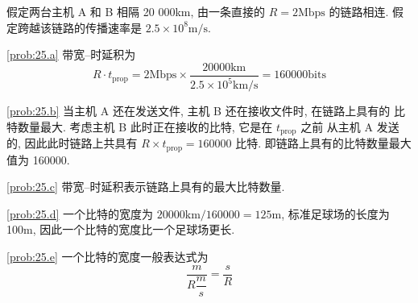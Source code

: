 \documentclass[boxes]{homework}
\begin{document}
\begin{problem}
假定两台主机 A 和 B 相隔 20 000km, 由一条直接的 $R = 2\text{Mbps}$ 的链路相连.
假定跨越该链路的传播速率是 $2.5 \times 10^{8}\text{m/s}$.
\end{problem}
\begin{solution}
    \ref{prob:25.a} 带宽--时延积为
    \begin{equation}
        R \cdot t_{\text{prop}} = 2\text{Mbps} \times
        \frac{ 20000\text{km} }{ 2.5 \times 10^{5} \text{km/s} } =
        160000\text{bits}
    \end{equation}

    \ref{prob:25.b} 当主机 A 还在发送文件, 主机 B 还在接收文件时, 在链路上具有的
    比特数量最大. 考虑主机 B 此时正在接收的比特, 它是在 $t_{\text{prop}}$ 之前
    从主机 A 发送的, 因此此时链路上共具有 $R \times t_{\text{prop}} = 160000$
    比特. 即链路上具有的比特数量最大值为 160000.

    \ref{prob:25.c} 带宽--时延积表示链路上具有的最大比特数量.

    \ref{prob:25.d} 一个比特的宽度为 $20000\text{km}/160000= 125$m,
    标准足球场的长度为 100m, 因此一个比特的宽度比一个足球场更长.

    \ref{prob:25.e} 一个比特的宽度一般表达式为
    \begin{equation}
        \frac{ m }{ R \dfrac{ m }{ s } } = \frac{ s }{ R }
    \end{equation}
\end{solution}
\end{document}
